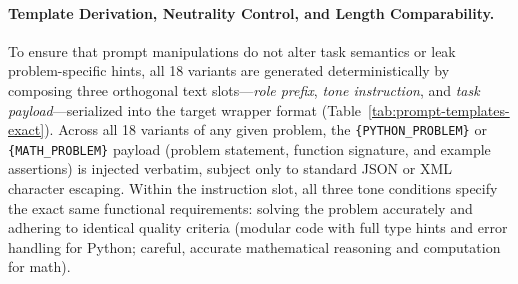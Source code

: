\documentclass[a4paper,fleqn]{cas-sc}
\begin{document}
\paragraph{Template Derivation, Neutrality Control, and Length Comparability.}
To ensure that prompt manipulations do not alter task semantics or leak problem-specific hints, all 18 variants are generated deterministically by composing three orthogonal text slots—\emph{role prefix}, \emph{tone instruction}, and \emph{task payload}—serialized into the target wrapper format (Table~\ref{tab:prompt-templates-exact}). Across all 18 variants of any given problem, the \texttt{\{PYTHON\_PROBLEM\}} or \texttt{\{MATH\_PROBLEM\}} payload (problem statement, function signature, and example assertions) is injected verbatim, subject only to standard JSON or XML character escaping. Within the instruction slot, all three tone conditions specify the exact same functional requirements: solving the problem accurately and adhering to identical quality criteria (modular code with full type hints and error handling for Python; careful, accurate mathematical reasoning and computation for math).
\end{document}

